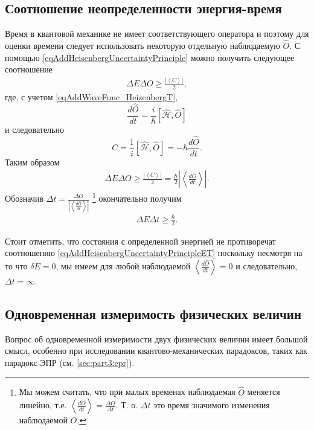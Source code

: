\subsection{Соотношение неопределенности энергия-время}
\label{AddHeisenbergUncertaintyPrincipleEnergyTime}
Время в квантовой механике не имеет соответствующего оператора и
поэтому для оценки времени следует использовать некоторую отдельную
наблюдаемую $\hat{O}$. С помощью
\eqref{eqAddHeisenbergUncertaintyPrinciple} можно получить следующее
соотношение
\begin{eqnarray}
  \Delta E \Delta O \ge \frac{\left|\left< C \right>\right|}{2},
  \nonumber
\end{eqnarray}
где, с учетом \eqref{eqAddWaveFunc_HeizenbergT},
\[
\frac{d \hat{O}}{d t} = \frac{i}{\hbar}
\left[\hat{\mathcal{H}}, \hat{O}\right]
\]
и следовательно
\[
C = \frac{1}{i}\left[\hat{\mathcal{H}}, \hat{O}\right] =
- \hbar \frac{d \hat{O}}{d t}.
\]
Таким образом
\begin{eqnarray}
  \Delta E \Delta O \ge \frac{\left|\left< C \right>\right|}{2} =
  \frac{\hbar}{2}\left|\left<\frac{d \hat{O}}{d t}\right>\right|.
  \nonumber
\end{eqnarray}
Обозначив $\Delta t = \frac{\Delta O}{\left|\left<\frac{d \hat{O}}{d
    t}\right>\right|}$
\footnote{
  Мы можем считать, что при малых временах наблюдаемая $\hat{O}$
  меняется линейно, т.е. $\left<\frac{d \hat{O}}{dt}\right> =
  \frac{\Delta O}{\Delta t}$. Т. о. $\Delta t$ это время значимого
  изменения наблюдаемой $O$. 
}
окончательно получим
\begin{eqnarray}
  \Delta E \Delta t \ge \frac{\hbar}{2}.
  \label{eqAddHeisenbergUncertaintyPrincipleET}
\end{eqnarray}

Стоит отметить, что состояния с определенной энергией не противоречат
соотношению \eqref{eqAddHeisenbergUncertaintyPrincipleET} поскольку
несмотря на то что $\delta E = 0$, мы имеем для любой наблюдаемой
$\left<\frac{d \hat{O}}{dt}\right> = 0$ и следовательно, $\Delta t =
\infty$. 

\subsection{Одновременная измеримость физических величин}
\label{AddHeisenbergUncertaintyPrincipleMesuranmet}
Вопрос об одновременной измеримости двух физических
величин имеет большой смысл, особенно при исследовании
квантово-механических парадоксов, таких как парадокс
ЭПР (см. \autoref{sec:part3:epr}).

